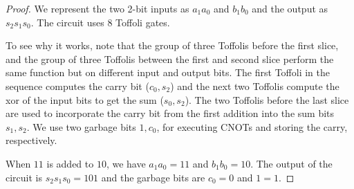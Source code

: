 \begin{solution}[label=ques:1]
\begin{proof}
    We represent the two 2-bit inputs as $a_1a_0$ and $b_1b_0$ and the output as $s_2s_1s_0$. The circuit uses 8 Toffoli gates.\par
    To see why it works, note that the group of three Toffolis before the first slice, and the group of three Toffolis between the first and second slice perform the same function but on different input and output bits. The first Toffoli in the sequence computes the carry bit ($c_0, s_2$) and the next two Toffolis compute the xor of the input bits to get the sum ($s_0, s_2$). The two Toffolis before the last slice are used to incorporate the carry bit from the first addition into the sum bits $s_1, s_2$. We use two garbage bits $1, c_0$, for executing CNOTs and storing the carry, respectively.\par
    When $11$ is added to $10$, we have $a_1a_0 = 11$ and $b_1b_0 = 10$. The output of the circuit is $s_2s_1s_0 = 101$ and the garbage bits are $c_0 = 0$ and $1 = 1$.
  \end{proof}
\end{solution}
